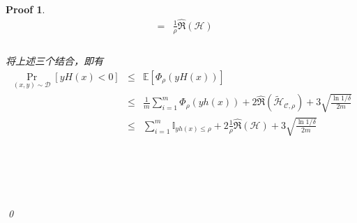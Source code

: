 \documentclass[a4paper,UTF8]{article}
\numberwithin{equation}{section}
\newtheorem*{myProof}{Proof}
\begin{document}
\begin{myProof}
\begin{eqnarray*}
&=& \frac{1}{\rho} \hat{\mathfrak{R}}(\mathcal{H}) \\
\end{eqnarray*} ~\\
将上述三个结合，即有
\begin{eqnarray*}
\Pr_{(x,y)\sim \mathcal{D}}[yH(x)<0] &\le& \mathbb{E}[ \Phi_\rho(yH(x)) ] \\
&\le& \frac{1}{m}\sum_{i=1}^m \Phi_\rho(yh(x)) + 2 \hat{\mathfrak{R}}(\tilde{\mathcal{H}}_{\mathcal{C},\rho}) + 3 \sqrt{\frac{\ln 1 / \delta}{2m}} \\
&\le& \sum_{i=1}^m \mathbb{I}_{yh(x) \le \rho} + 2 \frac{1}{\rho} \hat{\mathfrak{R}}(\mathcal{H}) + 3 \sqrt{\frac{\ln 1 / \delta}{2m}} \\
\end{eqnarray*}

	~\\
	~\\
	~\\
	~\\
	\qed
\end{myProof}
\newpage


\end{document}
